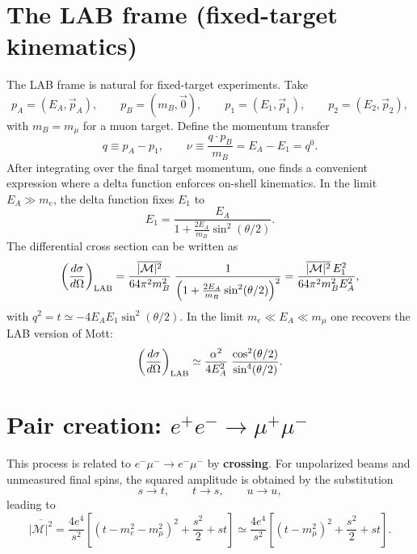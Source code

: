 \section{The LAB frame (fixed-target kinematics)}
The LAB frame is natural for fixed-target experiments. Take
\begin{equation}
p_A=(E_A,\vec p_A),\qquad p_B=(m_B,\vec 0),
\qquad
p_1=(E_1,\vec p_1),\qquad p_2=(E_2,\vec p_2),
\end{equation}
with $m_B=m_\mu$ for a muon target. Define the momentum transfer
\begin{equation}
q\equiv p_A-p_1,
\qquad
\nu\equiv \frac{q\cdot p_B}{m_B}=E_A-E_1=q^0.
\end{equation}
After integrating over the final target momentum, one finds a convenient expression where a delta function
enforces on-shell kinematics. In the limit $E_A\gg m_e$, the delta function fixes $E_1$ to
\begin{equation}
E_1=\frac{E_A}{1+\frac{2E_A}{m_B}\sin^2(\theta/2)}.
\end{equation}
The differential cross section can be written as
\begin{equation}
\left(\frac{d\sigma}{d\Omega}\right)_{\rm LAB}
=
\frac{\overline{|\mathcal{M}|^2}}{64\pi^2 m_B^2}\;
\frac{1}{\left(1+\frac{2E_A}{m_B}\sin^2(\theta/2)\right)^2}
=
\frac{\overline{|\mathcal{M}|^2}\,E_1^2}{64\pi^2 m_B^2 E_A^2},
\end{equation}
with $q^2=t\simeq -4E_AE_1\sin^2(\theta/2)$. In the limit $m_e\ll E_A\ll m_\mu$ one recovers the LAB version of Mott:
\begin{equation}
\left(\frac{d\sigma}{d\Omega}\right)_{\rm LAB}
\simeq
\frac{\alpha^2}{4E_A^2}\;\frac{\cos^2(\theta/2)}{\sin^4(\theta/2)}.
\end{equation}

\section{Pair creation: $e^+e^- \to \mu^+\mu^-$}
This process is related to $e^-\mu^-\to e^-\mu^-$ by \textbf{crossing}. For unpolarized beams and unmeasured final spins,
the squared amplitude is obtained by the substitution
\begin{equation}
s\to t,\qquad t\to s,\qquad u\to u,
\end{equation}
leading to
\begin{equation}
\overline{|\mathcal{M}|^2}
=
\frac{4e^4}{s^2}\left[(t-m_e^2-m_\mu^2)^2+\frac{s^2}{2}+st\right]
\simeq
\frac{4e^4}{s^2}\left[(t-m_\mu^2)^2+\frac{s^2}{2}+st\right].
\end{equation}

